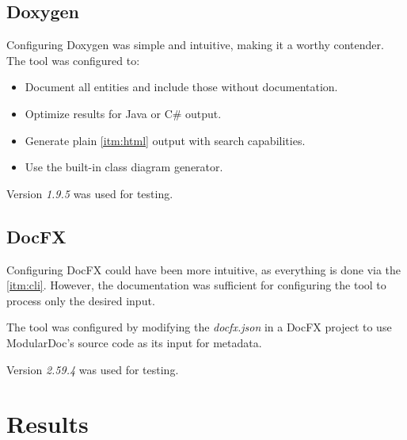 \subsection{Doxygen}

Configuring Doxygen was simple and intuitive, making it a worthy contender. The tool was configured to:
\begin{itemize}
    \item Document all entities and include those without documentation.
    \item Optimize results for Java or C\# output.
    \item Generate plain \ref{itm:html} output with search capabilities.
    \item Use the built-in class diagram generator.
\end{itemize}

Version \textit{1.9.5} was used for testing.

\subsection{DocFX}

Configuring DocFX could have been more intuitive, as everything is done via the \ref{itm:cli}.
However, the documentation was sufficient for configuring the tool to process only the desired input.

The tool was configured by modifying the \textit{docfx.json} in a DocFX project to use ModularDoc's source code as its input for metadata.

Version \textit{2.59.4} was used for testing.

\section{Results}

